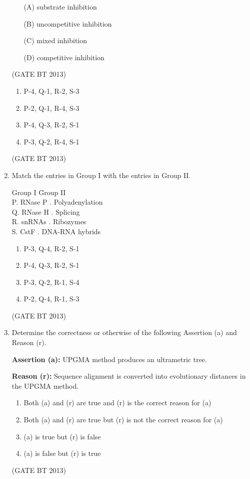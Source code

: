 \documentclass[journal,12pt,onecolumn]{IEEEtran}
\theoremstyle{remark}
\begin{document}
\begin{enumerate}
\begin{enumerate}
    \item[(A)] substrate inhibition
    \item[(B)] uncompetitive inhibition
    \item[(C)] mixed inhibition
    \item[(D)] competitive inhibition
\end{enumerate} \hfill(GATE BT 2013)


\begin{enumerate}
    \item P-4, Q-1, R-2, S-3
    \item P-2, Q-1, R-4, S-3
    \item P-4, Q-3, R-2, S-1
    \item P-3, Q-2, R-4, S-1
\end{enumerate} \hfill(GATE BT 2013)


\item 

Match the entries in Group I with the entries in Group II.

\begin{tabbing}
Group I \hspace{3.5cm} \= Group II \\
P. RNase P . Polyadenylation \\
Q. RNase H . Splicing \\
R. snRNAs . Ribozymes \\
S. CstF . DNA-RNA hybrids \\
\end{tabbing}

\begin{enumerate}
    \item P-3, Q-4, R-2, S-1
    \item P-4, Q-3, R-2, S-1
    \item P-3, Q-2, R-1, S-4
    \item P-2, Q-4, R-1, S-3
\end{enumerate} \hfill(GATE BT 2013)

\item 

Determine the correctness or otherwise of the following Assertion (a) and Reason (r).

\textbf{Assertion (a):} UPGMA method produces an ultrametric tree.

\textbf{Reason (r):} Sequence alignment is converted into evolutionary distances in the UPGMA method.

\begin{enumerate}
    \item Both (a) and (r) are true and (r) is the correct reason for (a)
    \item Both (a) and (r) are true but (r) is not the correct reason for (a)
    \item (a) is true but (r) is false
    \item (a) is false but (r) is true
\end{enumerate} \hfill(GATE BT 2013)


\end{enumerate}
\end{document}
